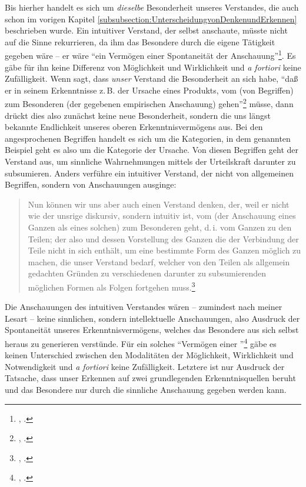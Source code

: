 Bis hierher handelt es sich um \emph{dieselbe} Besonderheit unseres
Verstandes, die auch schon im vorigen Kapitel
\ref{subsubsection:UnterscheidungvonDenkenundErkennen} beschrieben
wurde. Ein intuitiver Verstand, der selbst anschaute, müsste nicht auf
die Sinne rekurrieren, da ihm das Besondere durch die eigene Tätigkeit
gegeben wäre -- er wäre \enquote{ein Vermögen einer 
  Spontaneität der Anschauung}\footnote{\cite[][\S~77]{Kant:KritikderUrteilskraft2009},
  \cite[][V: 406.21--22]{Kant:GesammelteWerke1900ff.}.}. Es gäbe für
ihn keine Differenz von Möglichkeit und Wirklichkeit und \emph{a
  fortiori} keine Zufälligkeit. Wenn  sagt, dass
\emph{unser} Verstand die Besonderheit an sich habe, \enquote{daß er
  in seinem Erkenntnisse z.\,B. der Ursache eines 
Produkts, vom  (von Begriffen) zum Besonderen (der
gegebenen empirischen Anschauung) gehen}\footnote{\cite[][\S~77]{Kant:KritikderUrteilskraft2009},
\cite[][V: 407.13--16]{Kant:GesammelteWerke1900ff.}.} müsse, dann drückt dies also
zunächst keine neue Besonderheit, sondern die uns längst bekannte Endlichkeit unseres oberen
Erkenntnisvermögens aus. Bei den angesprochenen Begriffen handelt es sich um die
Kategorien, in dem genannten Beispiel geht es also um die Kategorie der Ursache. Von diesen
Begriffen geht der Verstand aus, um sinnliche Wahrnehmungen mittels der Urteilskraft darunter
zu subsumieren. Anders verführe ein intuitiver Verstand, der nicht von
allgemeinen Begriffen, sondern von Anschauungen ausginge:
\begin{quote}
Nun können wir uns aber auch einen Verstand denken, der, weil er nicht wie der
unsrige diskursiv, sondern intuitiv ist, vom  (der
Anschauung eines Ganzen als eines solchen) zum Besonderen geht, d.\,i. vom
Ganzen zu den Teilen; der also und dessen Vorstellung des Ganzen die
 der Verbindung der Teile nicht in sich enthält, um eine
bestimmte Form des Ganzen möglich zu machen, die unser Verstand bedarf, welcher
von den Teilen als allgemein gedachten Gründen zu verschiedenen darunter zu
subsumierenden möglichen Formen als Folgen fortgehen
muss.\footnote{\cite[][\S~77]{Kant:KritikderUrteilskraft2009},
\cite[][V: 407.19--28]{Kant:GesammelteWerke1900ff.}.}
\end{quote}
Die Anschauungen des intuitiven Verstandes wären -- zumindest nach meiner Lesart
-- keine sinnlichen, sondern intellektuelle Anschauungen, also Ausdruck der
Spontaneität unseres Erkenntnisvermögens, welches das Besondere aus sich selbst
heraus zu generieren verstünde. Für ein solches \enquote{Vermögen einer
}\footnote{\cite[][\S~77]{Kant:KritikderUrteilskraft2009},
\cite[][V: 406.21--22]{Kant:GesammelteWerke1900ff.}.} gäbe es keinen Unterschied
zwischen den Modalitäten der Möglichkeit, Wirklichkeit und Notwendigkeit und
\emph{a fortiori} keine Zufälligkeit. Letztere ist nur Ausdruck der Tatsache,
dass unser Erkennen auf zwei grundlegenden Erkenntnisquellen beruht und das
Besondere nur durch die sinnliche Anschauung gegeben werden kann.


